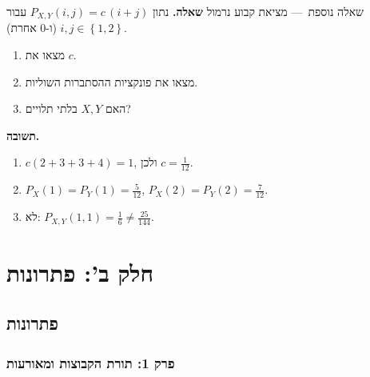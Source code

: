 \documentclass[11pt,a4paper]{report}
\newcommand{\set}[1]{\left\{#1\right\}}
\newcommand{\dash}{{\rmfamily —}}
\begin{document}
\begin{suggestion}{שאלה נוספת~\dash{} מציאת קבוע נרמול}
\textbf{שאלה.} נתון $P_{X,Y}(i,j)=c\,(i+j)$ עבור $i,j\in\set{1,2}$ (ו-$0$ אחרת).
\begin{enumerate}[label=(\alph*),itemsep=1pt,topsep=2pt]
  \item מצאו את $c$.
  \item מצאו את פונקציות ההסתברות השוליות.
  \item האם $X,Y$ בלתי תלויים?
\end{enumerate}

\textbf{תשובה.}
\begin{enumerate}[label=(\alph*),itemsep=1pt,topsep=2pt]
  \item $c(2+3+3+4)=1$, ולכן $c=\frac1{12}$.
  \item $P_X(1)=P_Y(1)=\frac5{12}$, $P_X(2)=P_Y(2)=\frac7{12}$.
  \item לא: $P_{X,Y}(1,1)=\frac16\neq\frac{25}{144}$.
\end{enumerate}
\end{suggestion}


\part*{חלק ב': פתרונות}
\chapter*{פתרונות}

\section*{פרק 1: תורת הקבוצות ומאורעות}
\end{document}
